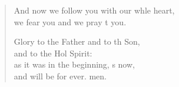 \begin{verse}
\begin{patverse}
And now we follow you with our whle heart,\Med\\
we fear you and we pray t you.

Glory to the Father and to th Son,\Med\\
    and to the Hol Spirit:\\
as it was in the beginning, \pointup{\i}s now,\Med\\
    and will be for ever. men.
  \end{patverse}
\end{verse}
